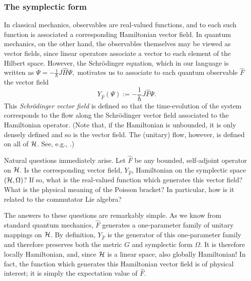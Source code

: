 \documentclass[12pt,aps,eqsecnum,tighten]{revtex4-2}
\def\be{\begin{equation}}
\def\ee{\end{equation}}
\def\H{{\cal H}}
\def\W{\Omega}
\begin{document}
\subsubsection{The symplectic form}

In classical mechanics, observables are real-valued functions, and to
each such function is associated a corresponding Hamiltonian vector
field.  In quantum mechanics, on the other hand, the observables
themselves may be viewed as vector fields, since linear operators
associate a vector to each element of the Hilbert space.  However, the
Schr\"odinger equation, which in our language is written as $ \dot\Psi
= - \frac{1}{\hbar} J \hat{H} \Psi, $ motivates us to associate to
each quantum observable $\hat{F}$ the vector field 
% 
\be
\label{schrodinger_vf}
      Y_{\hat{F}} (\Psi) := -\frac{1}{\hbar} J \hat{F} \Psi.
\ee
%
This {\em Schr\"odinger vector field} is defined so that the
time-evolution of the system corresponds to the flow along the
Schr\"odinger vector field associated to the Hamiltonian operator.
(Note that, if the Hamiltonian is unbounded, it is only densely
defined and so is the vector field. The (unitary) flow, however, is
defined on all of $\H$. See, e.g., \cite{chernoff_marsden}.)

Natural questions immediately arise.  Let $\hat{F}$ be any bounded,
self-adjoint operator on $\H$.  Is the corresponding vector field,
$Y_{\hat{F}}$, Hamiltonian on the symplectic space $(\H, \Omega)$?  If
so, what is the real-valued function which generates this vector
field?  What is the physical meaning of the Poisson bracket?  In
particular, how is it related to the commutator Lie algebra?

The answers to these questions are remarkably simple.  As we know from
standard quantum mechanics, $\hat{F}$ generates a one-parameter family
of unitary mappings on $\H$.  By definition, $Y_{\hat{F}}$ is the
generator of this one-parameter family and therefore preserves both
the metric $G$ and symplectic form $\W$.  It is therefore locally
Hamiltonian, and, since $\H$ is a linear space, also globally
Hamiltonian!  In fact, the function which generates this Hamiltonian
vector field is of physical interest; it is simply the expectation
value of $\hat{F}$.
\end{document}
